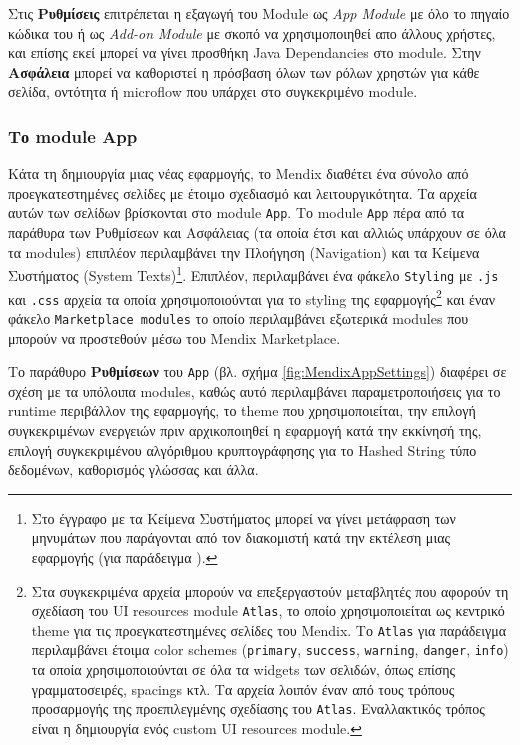             Στις \textbf{Ρυθμίσεις} επιτρέπεται η εξαγωγή του Module ως \textit{App Module} με όλο το πηγαίο κώδικα του ή ως \textit{Add-on Module} με σκοπό να χρησιμοποιηθεί απο άλλους χρήστες, και επίσης εκεί μπορεί να γίνει προσθήκη Java Dependancies στο module. Στην \textbf{Ασφάλεια} μπορεί να καθοριστεί η πρόσβαση όλων των ρόλων χρηστών για κάθε σελίδα, οντότητα ή microflow που υπάρχει στο συγκεκριμένο module.

            \subsubsection{Το module App}
            Κάτα τη δημιουργία μιας νέας εφαρμογής, το Mendix διαθέτει ένα σύνολο από προεγκατεστημένες σελίδες με έτοιμο σχεδιασμό και λειτουργικότητα. Τα αρχεία αυτών των σελίδων βρίσκονται στο module \texttt{App}. Το module \texttt{App} πέρα από τα παράθυρα των Ρυθμίσεων και Ασφάλειας (τα οποία έτσι και αλλιώς υπάρχουν σε όλα τα modules) επιπλέον περιλαμβάνει την Πλοήγηση (Navigation) και τα Κείμενα Συστήματος (System Texts)\footnote{Στο έγγραφο με τα Κείμενα Συστήματος μπορεί να γίνει μετάφραση των μηνυμάτων που παράγονται από τον διακομιστή κατά την εκτέλεση μιας εφαρμογής (για παράδειγμα ).}. Επιπλέον, περιλαμβάνει ένα φάκελο \texttt{Styling} με \texttt{.js} και \texttt{.css} αρχεία τα οποία χρησιμοποιούνται για το styling της εφαρμογής\footnote{Στα συγκεκριμένα αρχεία μπορούν να επεξεργαστούν μεταβλητές που αφορούν τη σχεδίαση του UI resources module \texttt{Atlas}, το οποίο χρησιμοποιείται ως κεντρικό theme για τις προεγκατεστημένες σελίδες του Mendix. Το \texttt{Atlas} για παράδειγμα περιλαμβάνει έτοιμα color schemes (\texttt{primary}, \texttt{success}, \texttt{warning}, \texttt{danger}, \texttt{info}) τα οποία χρησιμοποιούνται σε όλα τα widgets των σελιδών, όπως επίσης γραμματοσειρές, spacings κτλ. Τα αρχεία λοιπόν έναν από τους τρόπους προσαρμογής της προεπιλεγμένης σχεδίασης του \texttt{Atlas}. Εναλλακτικός τρόπος είναι η δημιουργία ενός custom UI resources module.} και έναν φάκελο \texttt{Marketplace modules} το οποίο περιλαμβάνει εξωτερικά modules που μπορούν να προστεθούν μέσω του Mendix Marketplace.

            Το παράθυρο \textbf{Ρυθμίσεων} του \texttt{App} (βλ. σχήμα \ref{fig:MendixAppSettings}) διαφέρει σε σχέση με τα υπόλοιπα modules, καθώς αυτό περιλαμβάνει παραμετροποιήσεις για το runtime περιβάλλον της εφαρμογής, το theme που χρησιμοποιείται, την επιλογή συγκεκριμένων ενεργειών πριν αρχικοποιηθεί η εφαρμογή κατά την εκκίνησή της, επιλογή συγκεκριμένου αλγόριθμου κρυπτογράφησης για το Hashed String τύπο δεδομένων, καθορισμός γλώσσας και άλλα.


